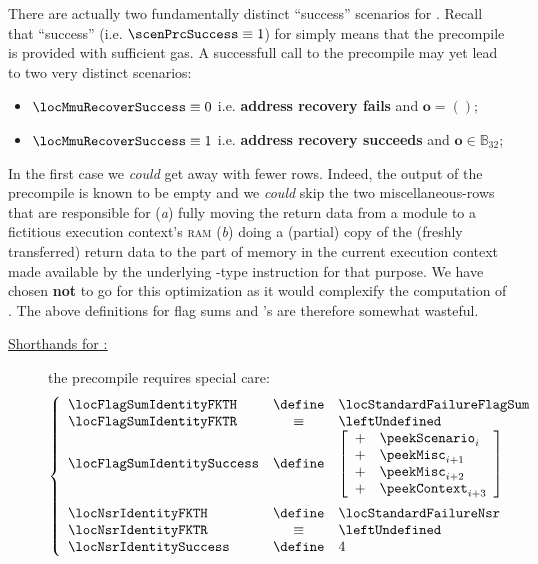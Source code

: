 \saNote{}
There are actually two fundamentally distinct ``success'' scenarios for .
Recall that ``success'' (i.e. $\scenPrcSuccess \equiv 1$) for  simply means that the precompile is provided with sufficient gas.
A successfull call to the  precompile may yet lead to two very distinct scenarios:
\begin{itemize}
	\item $\locMmuRecoverSuccess \equiv 0$ i.e. \textbf{address recovery fails}    and $\textbf{o} = ()$;
	\item $\locMmuRecoverSuccess \equiv 1$ i.e. \textbf{address recovery succeeds} and $\textbf{o} \in \mathbb{B}_{32}$;
\end{itemize}
In the first case we \emph{could} get away with fewer rows.
Indeed, the output of the precompile  is known to be empty and we \emph{could} skip the two miscellaneous-rows that are responsible for
(\emph{a}) fully moving the return data from a \ecDataMod{} module to a fictitious execution context's \textsc{ram}
(\emph{b}) doing a (partial) copy of the (freshly transferred) return data to the part of memory in the current execution context made available by the underlying -type instruction for that purpose.
We have chosen \textbf{not} to go for this optimization as it would complexify the computation of \nonStackRows{}. 
The above definitions for flag sums and 's are therefore somewhat wasteful.
\begin{description}
	\item[\underline{\underline{Shorthands for :}}] the  precompile requires special care:
		\[
			\left\{ \begin{array}{lcl}
				\locFlagSumIdentityFKTH    & \define & \locStandardFailureFlagSum \\
				\locFlagSumIdentityFKTR    & \equiv  & \leftUndefined             \\
				\locFlagSumIdentitySuccess & \define &
				\left[ \begin{array}{cl}
					+ & \peekScenario  _{i    } \\ 
					+ & \peekMisc      _{i + 1} \\ 
					+ & \peekMisc      _{i + 2} \\ 
					+ & \peekContext   _{i + 3} \\ 
				\end{array} \right] \vspace{2mm} \\
				\locNsrIdentityFKTH    & \define & \locStandardFailureNsr \\
				\locNsrIdentityFKTR    & \equiv  & \leftUndefined         \\
				\locNsrIdentitySuccess & \define & 4                      \\
			\end{array} \right.
		\]
\end{description}
